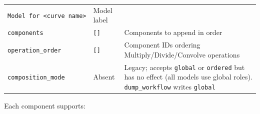 \documentclass[
  10pt,
  a4paper,
  oneside]{scrreprt}
\begin{document}
\begin{longtable}[]{@{}lll@{}}
\begin{minipage}[t]{0.30\columnwidth}
\texttt{Model\ for\ \textless{}curve\ name\textgreater{}}\strut
\end{minipage} & \begin{minipage}[t]{0.30\columnwidth}\raggedright
Model label\strut
\end{minipage}\tabularnewline
\begin{minipage}[t]{0.30\columnwidth}\raggedright
\texttt{components}\strut
\end{minipage} & \begin{minipage}[t]{0.30\columnwidth}\raggedright
\texttt{{[}{]}}\strut
\end{minipage} & \begin{minipage}[t]{0.30\columnwidth}\raggedright
Components to append in order\strut
\end{minipage}\tabularnewline
\begin{minipage}[t]{0.30\columnwidth}\raggedright
\texttt{operation\_order}\strut
\end{minipage} & \begin{minipage}[t]{0.30\columnwidth}\raggedright
\texttt{{[}{]}}\strut
\end{minipage} & \begin{minipage}[t]{0.30\columnwidth}\raggedright
Component IDs ordering Multiply/Divide/Convolve operations\strut
\end{minipage}\tabularnewline
\begin{minipage}[t]{0.30\columnwidth}\raggedright
\texttt{composition\_mode}\strut
\end{minipage} & \begin{minipage}[t]{0.30\columnwidth}\raggedright
Absent\strut
\end{minipage} & \begin{minipage}[t]{0.30\columnwidth}\raggedright
Legacy; accepts \texttt{global} or \texttt{ordered} but has no effect
(all models use global roles). \texttt{dump\_workflow} writes
\texttt{global}\strut
\end{minipage}\tabularnewline
\bottomrule
\end{longtable}

Each component supports:
\end{document}
